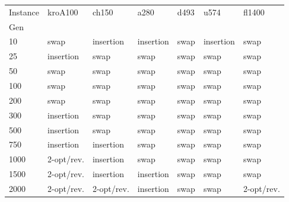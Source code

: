 \begin{tabular}{lllllll}
\toprule
Instance & kroA100 & ch150 & a280 & d493 & u574 & fl1400 \\
Gen &  &  &  &  &  &  \\
\midrule
10 & swap & insertion & insertion & swap & insertion & swap \\
25 & insertion & swap & swap & swap & swap & swap \\
50 & swap & swap & swap & swap & swap & swap \\
100 & swap & swap & swap & swap & swap & swap \\
200 & swap & swap & swap & swap & swap & swap \\
300 & insertion & swap & swap & swap & swap & swap \\
500 & insertion & swap & swap & swap & swap & swap \\
750 & insertion & insertion & swap & swap & swap & swap \\
1000 & 2-opt/rev. & insertion & swap & swap & swap & swap \\
1500 & 2-opt/rev. & insertion & insertion & swap & swap & swap \\
2000 & 2-opt/rev. & 2-opt/rev. & insertion & swap & swap & 2-opt/rev. \\
\bottomrule
\end{tabular}
